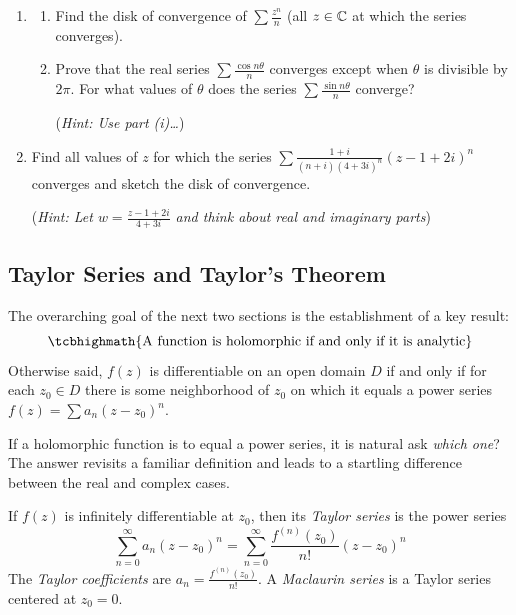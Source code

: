 \begin{exercises}
\begin{enumerate}
\begin{enumerate}
	    \item\begin{enumerate}
	      \item Find the disk of convergence of $\sum\frac{z^n}n$ (all $z\in\mathbb{C}$ at which the series converges).
	    	\item Prove that the real series $\sum\frac{\cos n\theta}n$ converges except when $\theta$ is divisible by $2\pi$. For what values of $\theta$ does the series $\sum\frac{\sin n\theta}n$ converge?\par
	    	(\emph{Hint: Use part (i)\ldots})
	   	\end{enumerate}
	    
	    \item Find all values of $z$ for which the series $\sum \frac{1+i}{(n+i)(4+3i)^n}(z-1+2i)^n$ converges and sketch the disk of convergence.\par
	    (\emph{Hint: Let $w=\frac{z-1+2i}{4+3i}$ and think about real and imaginary parts})
	  \end{enumerate}
	\end{enumerate}
	
\end{exercises}


\clearpage



\subsection{Taylor Series and Taylor's Theorem}

The overarching goal of the next two sections is the establishment of a key result:
\[
	\tcbhighmath{\text{A function is holomorphic if and only if it is analytic}}
\]
Otherwise said, $f(z)$ is differentiable on an open domain $D$ if and only if for each $z_0\in D$ there is some neighborhood of $z_0$ on which it equals a power series $f(z)=\sum a_n(z-z_0)^n$.\smallbreak

If a holomorphic function is to equal a power series, it is natural ask \emph{which one}? The answer revisits a familiar definition and leads to a startling difference between the real and complex cases.

\begin{defn}{}{}
	If $f(z)$ is infinitely differentiable at $z_0$, then its \emph{Taylor series} is the power series
	\[
		\sum_{n=0}^\infty a_n(z-z_0)^n= \sum_{n=0}^\infty \frac{f^{(n)}(z_0)}{n!}(z-z_0)^n
	\]
	The \emph{Taylor coefficients} are $a_n=\frac{f^{(n)}(z_0)}{n!}$. A \emph{Maclaurin series} is a Taylor series centered at $z_0=0$.
\end{defn}

